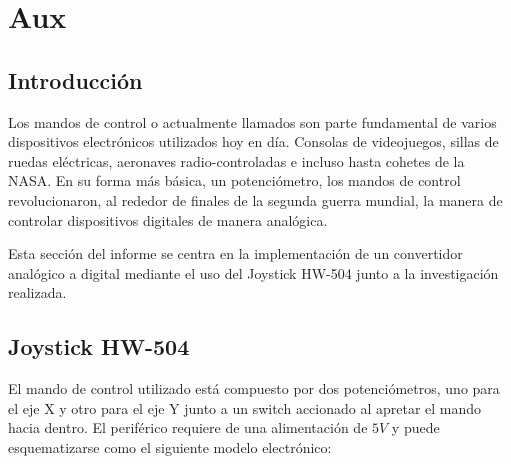 

\section{Aux}
\tableofcontents

\subsection{Introducción}

Los mandos de control o actualmente llamados  son parte fundamental de varios dispositivos electrónicos utilizados hoy en día. Consolas de videojuegos, sillas de ruedas eléctricas, aeronaves radio-controladas e incluso hasta cohetes de la NASA. En su forma más básica, un potenciómetro, los mandos de control revolucionaron, al rededor de finales de la segunda guerra mundial, la manera de controlar dispositivos digitales de manera analógica. 

Esta sección del informe se centra en la implementación de un convertidor analógico a digital mediante el uso del Joystick HW-504 junto a la investigación realizada.

\subsection{Joystick HW-504}

El mando de control utilizado está compuesto por dos potenciómetros, uno para el eje X y otro para el eje Y junto a un switch accionado al apretar el mando hacia dentro. El periférico requiere de una alimentación de $5V$ y puede esquematizarse como el siguiente modelo electrónico:

